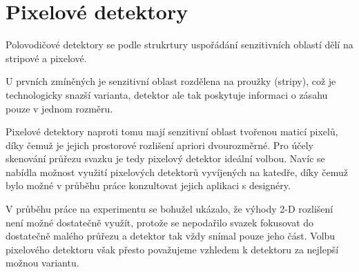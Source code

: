 

\clearpage

\section{Pixelové detektory}
Polovodičové detektory se podle strukrtury uspořádání senzitivních oblastí dělí na stripové a pixelové. 

U prvních zmíněných je senzitivní oblast rozdělena na proužky (stripy), což je technologicky snazší varianta, detektor ale tak poskytuje informaci o zásahu pouze v jednom rozměru. 

Pixelové detektory naproti tomu mají senzitivní oblast tvořenou maticí pixelů, díky čemuž je jejich prostorové rozlišení apriori dvourozměrné. Pro účely skenování průřezu svazku je tedy pixelový detektor ideální volbou. Navíc se nabídla možnost využití pixelových detektorů vyvíjených na katedře, díky čemuž bylo možné v průběhu práce konzultovat jejich aplikaci s designéry.

V průběhu práce na experimentu se bohužel ukázalo, že výhody 2-D rozlišení není možné dostatečně využít, protože se nepodařilo svazek fokusovat do dostatečně malého průřezu a detektor tak vždy snímal pouze jeho část. Volbu pixelového detektoru však přesto považujeme vzhledem k detektoru za nejlepší možnou variantu.


